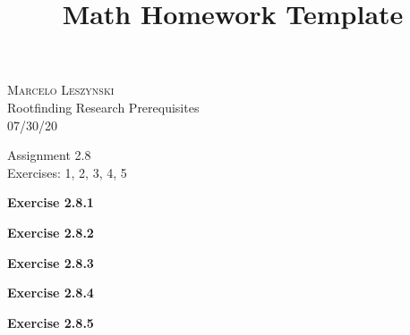 \documentclass[12pt,oneside]{article}
\newenvironment{exercise}[1]{\vspace{.1in}\noindent\textbf{Exercise #1 \hspace{.05em}}}{}
\begin{document}
\title{Math Homework Template}

\begin{flushright}
\textsc{Marcelo Leszynski}  \\
Rootfinding Research Prerequisites\\
07/30/20
\end{flushright}

\begin{center}
\textsf{Assignment 2.8 } \\
\textsf{Exercises: 1, 2, 3, 4, 5 }
\end{center}


\begin{exercise}{2.8.1}

\end{exercise}


\begin{exercise}{2.8.2}

\end{exercise}


\begin{exercise}{2.8.3}

\end{exercise}


\begin{exercise}{2.8.4}

\end{exercise}


\begin{exercise}{2.8.5}

\end{exercise}


\end{document}
